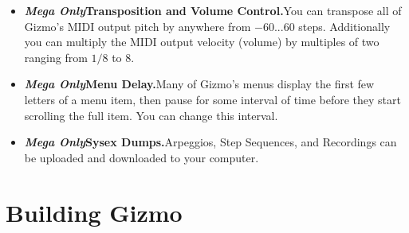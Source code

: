 \documentclass{article}
\begin{document}
\begin{itemize}

\item {\bf \textit{Mega Only}\quad Transposition and Volume Control.}\quad You can transpose all of Gizmo's MIDI output pitch by anywhere from \(-60...60\) steps.  Additionally you can multiply the MIDI output velocity (volume) by multiples of two ranging from \(1/8\) to \(8\).

\item {\bf \textit{Mega Only}\quad Menu Delay.}\quad Many of Gizmo's menus display the first few letters of a menu item, then pause for some interval of time before they start scrolling the full item.  You can change this interval.

\item {\bf \textit{Mega Only}\quad Sysex Dumps.}\quad Arpeggios, Step Sequences, and Recordings can be uploaded and downloaded to your computer.

\end{itemize} 

\clearpage

\section{Building Gizmo}
\end{document}
